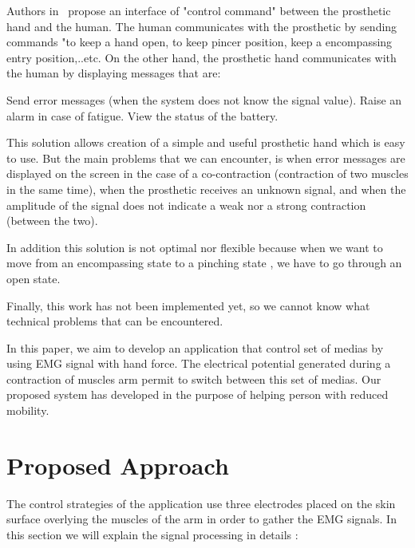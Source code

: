 \documentclass[conference]{IEEEtran}
\begin{document}
Authors in~\cite{Atieh} propose an interface of "control command" between the prosthetic hand and the human. The human communicates with the prosthetic by sending commands "to keep a hand open, to keep pincer position, keep a encompassing entry position,..etc. On the other hand, the prosthetic hand communicates with the human by displaying messages that are:\par
Send error messages (when the system does not know the signal value). Raise an alarm in case of fatigue. View the status of the battery.\par
This solution allows creation of a simple and useful prosthetic hand which is easy to use. But the main problems that we can encounter, is when error messages are displayed on the screen in the case of a co-contraction (contraction of two muscles in the same time), when the prosthetic receives an unknown signal, and when the amplitude of the signal does not indicate a weak nor a strong contraction (between the two).\par
In addition this solution is not optimal nor flexible because when we want to move from an encompassing state to a pinching state , we have to go through an open state.\par
Finally, this work has not been implemented yet, so we cannot know what technical problems that can be encountered. \par


In this paper, we aim to develop an application that control set of medias by using EMG signal with hand force. The electrical potential generated during a contraction of muscles arm permit to switch between this set of medias. Our proposed system has developed in the purpose of helping person with reduced mobility. \par
\section{Proposed Approach} \label{sec:proposedapproach}
The control strategies of the application use three electrodes placed on the skin surface overlying the
muscles of the arm in order to gather the EMG signals. In this section we will explain the signal processing in details :
\end{document}
